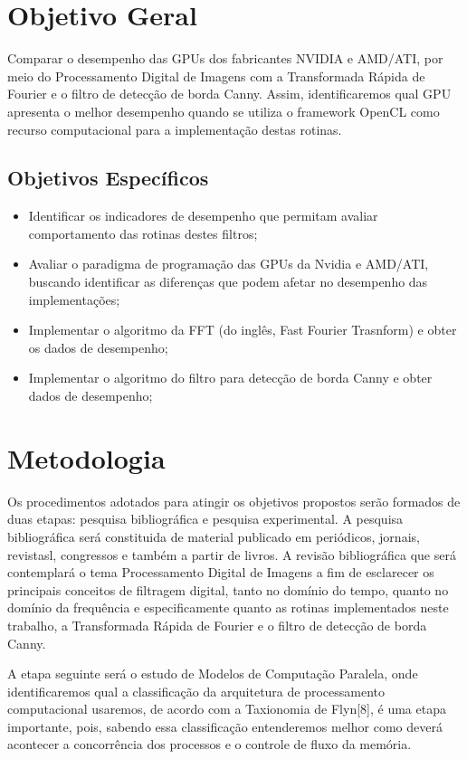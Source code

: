 \section{Objetivo Geral}

Comparar o desempenho das GPUs dos fabricantes NVIDIA e AMD/ATI, por meio do Processamento Digital de Imagens com a Transformada Rápida de Fourier e o filtro de detecção de borda Canny. Assim,  identificaremos 	qual GPU apresenta o melhor desempenho quando se utiliza o framework OpenCL como recurso computacional para a implementação destas rotinas.
\subsection{Objetivos Específicos}
\begin{itemize}
\item Identificar os indicadores de desempenho que permitam avaliar comportamento das rotinas destes filtros;
\item Avaliar o paradigma de programação das GPUs da Nvidia e AMD/ATI, buscando identificar as diferenças que podem afetar no desempenho das implementações;
\item Implementar o algoritmo da FFT (do inglês, Fast Fourier Trasnform) e obter os dados de desempenho;
\item Implementar o algoritmo do filtro para detecção de borda Canny e obter dados de desempenho;

\end{itemize}

\section{Metodologia}

Os procedimentos adotados para atingir os objetivos propostos serão formados de duas etapas: pesquisa bibliográfica e pesquisa experimental. A pesquisa bibliográfica será constituida de material publicado em periódicos, jornais, revistasl, congressos e também a partir de livros. A revisão bibliográfica que será contemplará o tema Processamento Digital de Imagens a fim de esclarecer os principais conceitos de filtragem digital, tanto no domínio do tempo, quanto no domínio da frequência e especificamente quanto as rotinas implementados neste trabalho, a Transformada Rápida de Fourier e o filtro de detecção de borda Canny.

A etapa seguinte será o estudo de Modelos de Computação Paralela, onde identificaremos qual a classificação da arquitetura de processamento computacional usaremos, de acordo com a Taxionomia de Flyn[8], é uma etapa importante, pois, sabendo essa classificação entenderemos melhor como deverá acontecer a concorrência dos processos e o controle de fluxo da memória.

